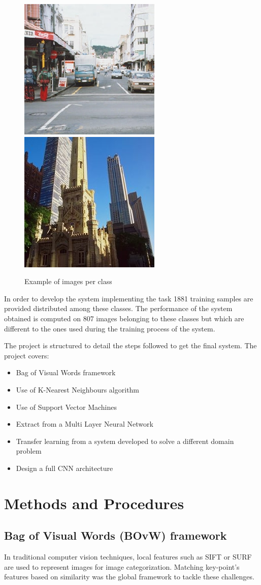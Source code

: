 \documentclass[runningheads]{llncs}
\begin{document}
\begin{figure}
  \includegraphics[width=.2\textwidth]{street.jpg}\hfill
  \includegraphics[width=.2\textwidth]{tallbuilding.jpg}
  \caption{Example of images per class}
\end{figure}

In order to develop the system implementing the task 1881 training samples are provided distributed among these classes. 
The performance of the system obtained is computed on 807 images belonging to these classes but which are different to the ones used during the training process of the system.

The project is structured to detail the steps followed to get the final system. The project covers:
\begin{itemize}
	\item Bag of Visual Words framework
	\item Use of K-Nearest Neighbours algorithm
	\item Use of Support Vector Machines
	\item Extract from a Multi Layer Neural Network
	\item Transfer learning from a system developed to solve a different domain problem
	\item Design a full CNN architecture
\end{itemize}

\section{Methods and Procedures}
\subsection{Bag of Visual Words (BOvW) framework} \label{BOvW}

In traditional computer vision techniques, local features such as SIFT or SURF \cite{790410} are used to represent images for image categorization. Matching key-point's features based on similarity was the global framework to tackle these challenges.
\end{document}
